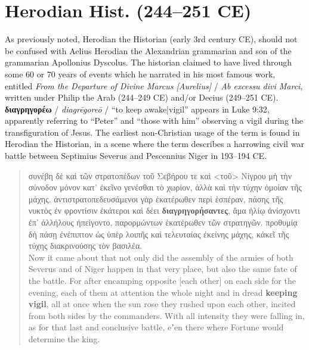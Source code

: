 %
%
\chapter{Herodian Hist. (244--251 CE)}
%
\vspace*{3mm}
%
\justifying

\noindent{}As previously noted, Herodian the Historian (early 3rd century CE), %
should not be confused with Aelius Herodian the Alexandrian grammarian %
and son of the grammarian Apollonius Dyscolus. %
The historian claimed to have lived through some 60 or 70 years of events %
which he narrated in his most famous work, %
entitled \textit{From the Departure of Divine Marcus [Aurelius]} / %
\textit{Ab excessu divi Marci}, %
written under Philip the Arab (244--249 CE) and/or Decius (249--251 CE). \\[1.5mm] %

\noindent{}\textbf{διαγρηγορέω} / \textit{diagrēgoreō} / “to keep awake|vigil” appears in Luke 9:32, %
apparently referring to “Peter” and “those with him” observing a vigil during the transfiguration of Jesus. %
The earliest non-Christian usage of the term is found in Herodian the Historian, %
in a scene where the term describes a harrowing civil war battle %
between Septimius Severus and Pescennius Niger in 193--194 CE. %

\vspace*{3mm}
 \begin{quote}συνέβη δὲ καὶ τῶν στρατοπέδων τοῦ Σεβήρου τε καὶ %
 <τοῦ> Νίγρου μὴ τὴν σύνοδον μόνον κατ’ ἐκεῖνο γενέσθαι τὸ χωρίον, %
 ἀλλὰ καὶ τὴν τύχην ὁμοίαν τῆς μάχης. %
 ἀντιστρατοπεδευσάμενοι γὰρ ἑκατέρωθεν περὶ ἑσπέραν, %
 πάσης τῆς νυκτὸς ἐν φροντίσιν ἑκάτεροι καὶ δέει \textbf{διαγρηγορήσαντες}, %
 ἅμα ἡλίῳ ἀνίσχοντι ἐπ’ ἀλλήλους ἠπείγοντο, %
 παρορμώντων ἑκατέρωθεν τῶν στρατηγῶν. %
 προθυμίᾳ δὴ πάσῃ ἐνέπιπτον ὡς ὑπὲρ λοιπῆς καὶ τελευταίας ἐκείνης μάχης, %
 κἀκεῖ τῆς τύχης διακρινούσης τὸν βασιλέα. \\[0.1mm] %
 Now it came about that not only did the assembly of the armies of both Severus %
 and of Niger happen in that very place, but also the same fate of the battle. %
 For after encamping opposite [each other] on each side for the evening, %
 each of them at attention the whole night and in dread \textbf{keeping vigil}, %
 all at once when the sun rose they rushed upon each other, %
 incited from both sides by the commanders. %
 With all intensity they were falling in, as for that last and conclusive battle, %
 eʼen there where Fortune would determine the king.\end{quote} %
\vspace*{3mm}

